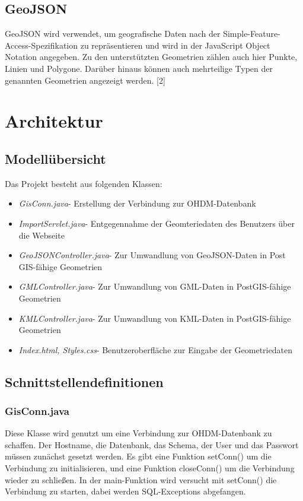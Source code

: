 \documentclass[]{article}
\begin{document}
\subsection{GeoJSON}
GeoJSON wird verwendet, um geografische Daten nach der Simple-Feature-Access-Spezifikation zu repräsentieren und wird in der JavaScript Object Notation angegeben. Zu den unterstützten Geometrien zählen auch hier Punkte, Linien und Polygone. Darüber hinaus können auch mehrteilige Typen der genannten Geometrien angezeigt werden. [2]

\section{Architektur}
\subsection{Modellübersicht}
Das Projekt besteht aus folgenden Klassen:
\begin{itemize}
	\item \textit{GisConn.java}- Erstellung der Verbindung zur OHDM-Datenbank
	\item \textit{ImportServlet.java}- Entgegennahme der Geomteriedaten des Benutzers über die Webseite
	\item \textit{GeoJSONController.java}- Zur Umwandlung von GeoJSON-Daten in Post\\GIS-fähige Geometrien
	\item \textit{GMLController.java}- Zur Umwandlung von GML-Daten in PostGIS-fähige Geometrien
	\item \textit{KMLController.java}- Zur Umwandlung von KML-Daten in PostGIS-fähige Geometrien
	\item \textit{Index.html, Styles.css}- Benutzeroberfläche zur Eingabe der Geometriedaten
\end{itemize}


\subsection{Schnittstellendefinitionen}
\subsubsection{GisConn.java}
Diese Klasse wird genutzt um eine Verbindung zur OHDM-Datenbank zu schaffen. Der Hostname, die Datenbank, das Schema, der User und das Passwort müssen zunächst gesetzt werden. Es gibt eine Funktion setConn() um die Verbindung zu initialisieren, und eine Funktion closeConn() um die Verbindung wieder zu schließen. In der main-Funktion wird versucht mit setConn() die Verbindung zu starten, dabei werden SQL-Exceptions abgefangen.
\end{document}
